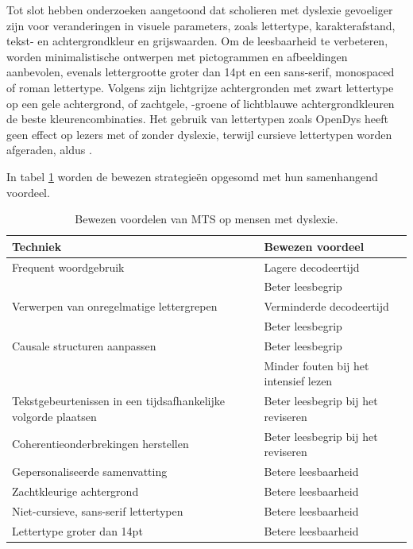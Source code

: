 \medspace

Tot slot hebben onderzoeken aangetoond dat scholieren met dyslexie gevoeliger zijn voor veranderingen in visuele parameters, zoals lettertype, karakterafstand, tekst- en achtergrondkleur en grijswaarden. Om de leesbaarheid te verbeteren, worden minimalistische ontwerpen met pictogrammen en afbeeldingen aanbevolen, evenals lettergrootte groter dan 14pt en een sans-serif, monospaced of roman lettertype. Volgens \textcite{Rello2015, Bezem2016, Rello2017} zijn lichtgrijze achtergronden met zwart lettertype op een gele achtergrond, of zachtgele, -groene of lichtblauwe achtergrondkleuren de beste kleurencombinaties. Het gebruik van lettertypen zoals OpenDys heeft geen effect op lezers met of zonder dyslexie, terwijl cursieve lettertypen worden afgeraden, aldus \textcite{Rello2013b, Rello2015}.

\medspace

In tabel \ref{table:benefits-mts} worden de bewezen strategieën opgesomd met hun samenhangend voordeel.

\medspace

\begin{center}
	\begin{table}[H]
	\begin{tabular}{ | m{6cm} | m{6cm} | } 
	\hline
	\textbf{Techniek} & \textbf{Bewezen voordeel} \\
	\hline
	Frequent woordgebruik & Lagere decodeertijd \\
	& Beter leesbegrip \\
	\hline	
	Verwerpen van onregelmatige lettergrepen & Verminderde decodeertijd \\
	& Beter leesbegrip \\	
	\hline
	Causale structuren aanpassen & Beter leesbegrip \\
	& Minder fouten bij het intensief lezen \\
	\hline	
	Tekstgebeurtenissen in een tijdsafhankelijke volgorde plaatsen & Beter leesbegrip bij het reviseren \\
	\hline
	Coherentieonderbrekingen herstellen & Beter leesbegrip bij het reviseren \\
	\hline
	Gepersonaliseerde samenvatting & Betere leesbaarheid \\
	\hline
	Zachtkleurige achtergrond & Betere leesbaarheid \\
	\hline
	Niet-cursieve, sans-serif lettertypen & Betere leesbaarheid \\
	\hline
	Lettertype groter dan 14pt & Betere leesbaarheid \\
	\hline
	\end{tabular}
	\caption{Bewezen voordelen van MTS op mensen met dyslexie.}
	\label{table:benefits-mts}
	\end{table}
\end{center}


